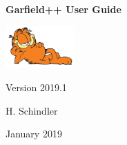 \begin{titlepage}
  {
  \centering
  \sffamily
  \linespread{1.5}

  \vspace{3cm} 

  \huge{\textbf{Garfield++ User Guide}}

  \vspace{2cm}

  \includegraphics[width=0.2\textwidth]{garfield.jpg}

  \vspace{2cm}

  \large
  Version 2019.1 

  \vspace{2cm}
  \large
  H. Schindler

  \vfill

  January 2019

  }
\end{titlepage}
